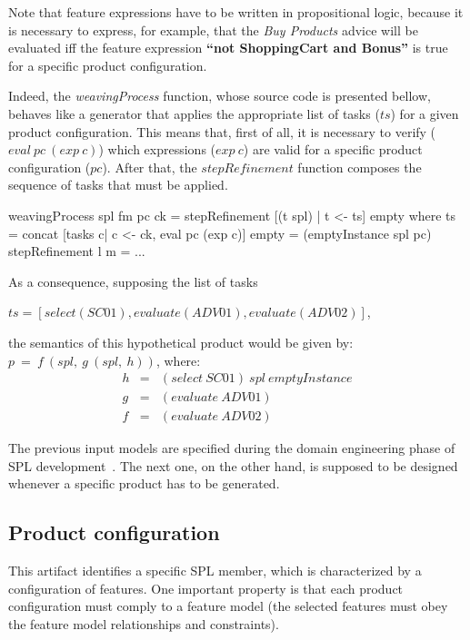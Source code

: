 Note that feature expressions have to be written in propositional
logic, because it is necessary to express, for example, that the \emph{Buy Products} advice will be evaluated iff the feature expression {\bf ``not ShoppingCart and Bonus''} is true for a specific product configuration.

Indeed, the \emph{weavingProcess} function, whose source code is presented bellow, behaves like a generator that applies 
the appropriate list of tasks ($ts$) for a given product configuration. This means 
that, first of all, it is necessary to verify  ($eval\ pc\ (exp\ c)$) which expressions ($exp\ c$) 
are valid for a specific product configuration ($pc$). After that, the
$stepRefinement$ function composes the sequence of tasks that must be applied. 

\begin{code}
weavingProcess spl fm pc ck =
   stepRefinement [(t spl) | t <- ts] empty 
   where
    ts = concat [tasks c| c <- ck, eval pc (exp c)] 
    empty = (emptyInstance spl pc)
    stepRefinement l m = ...
 \end{code}
 
As a consequence, supposing the list of tasks
 
$ts=[select(SC01),evaluate(ADV01),evaluate(ADV02)]$,
 
the semantics of this hypothetical product would be given by: $p\ =\  f\ (spl,\ g\ (spl,\ h))$, where:
\begin{eqnarray*}
h  & = & (select\ SC01)\ spl\ emptyInstance \\
g  & = & (evaluate\ ADV01) \\
f   & = & (evaluate\ ADV02) 
\end{eqnarray*}

The previous input models are specified during the domain
engineering phase of SPL development~\cite{Clements:2001aa,Pohl:2005aa}. The next
one, on the other hand, is supposed to be designed whenever a specific product
has to be generated.

\subsection{Product configuration}\label{subsub:pc}

This artifact identifies a specific SPL member, which is characterized by a
configuration of features. One important property is that each product
configuration must comply to a feature model (the selected features must obey
the feature model relationships and constraints).

